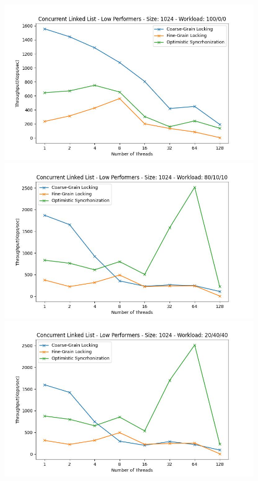 \documentclass[../final_report.tex]{subfiles}
\begin{document}
\begin{figure}[H]
    \centering
        \includegraphics[scale=0.4]{outFiles/plots/concurrent_data_structs_low_1024_100_0_0.jpg}
        \includegraphics[scale=0.4]{outFiles/plots/concurrent_data_structs_low_1024_80_10_10.jpg}
        \includegraphics[scale=0.4]{outFiles/plots/concurrent_data_structs_low_1024_20_40_40.jpg}

\end{figure}
\end{document}
